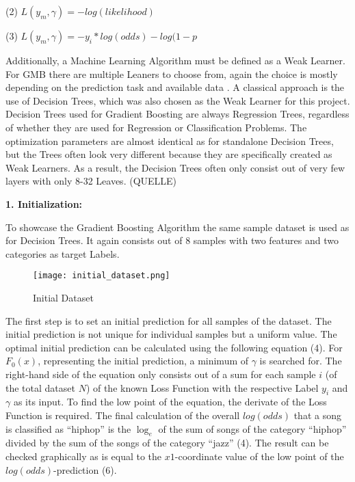 (2) \( L(y_{m}, \gamma) = - log(likelihood) \) 

(3) \( L(y_{m}, \gamma) = - y_{i} * log(odds) - log(1-p \)

Additionally, a Machine Learning Algorithm must be defined as a Weak Learner. For GMB there 
are multiple Leaners to choose from, again the choice is mostly depending on the prediction 
task and available data \cite[3.2]{Natekin2013}. A classical approach is the use of Decision Trees, which was also 
chosen as the Weak Learner for this project. Decision Trees used for Gradient Boosting are 
always Regression Trees, regardless of whether they are used for Regression or Classification 
Problems. The optimization parameters are almost identical as for standalone Decision Trees, 
but the Trees often look very different because they are specifically created as Weak Learners. 
As a result, the Decision Trees often only consist out of very few layers with only 8-32 Leaves.
(QUELLE)

\textbf{1. Initialization:}

To showcase the Gradient Boosting Algorithm the same sample dataset is used as for Decision Trees. 
It again consists out of 8 samples with two features and two categories as target Labels. 

\begin{figure}[H]
    \centering
    \caption[]{Initial Dataset}
	\label{fig:initial_dataset}
    \texttt{[image: initial\_dataset.png]}
\end{figure}

The first step is to set an initial prediction for all samples of the dataset. The initial 
prediction is not unique for individual samples but a uniform value. The optimal initial 
prediction can be calculated using the following equation (4). For \(F_{0}(x)\), representing the 
initial prediction, a minimum of \(\gamma \) is searched for. The right-hand side of the equation 
only consists out of a sum for each sample \(i\) (of the total dataset \(N\)) of the known Loss Function 
with the respective Label \(y_{i}\) and \(\gamma \) as its input. To find the low point of the equation, 
the derivate of the Loss Function is required. The final calculation of the overall \(log (odds)\) 
that a song is classified as “hiphop” is the \(\log_{e}\) of the sum of songs of the category “hiphop” 
divided by the sum of the songs of the category “jazz” (4). The result can be checked graphically 
as is equal to the \(x1\)-coordinate value of the low point of the \(log(odds)\)-prediction (6). 

